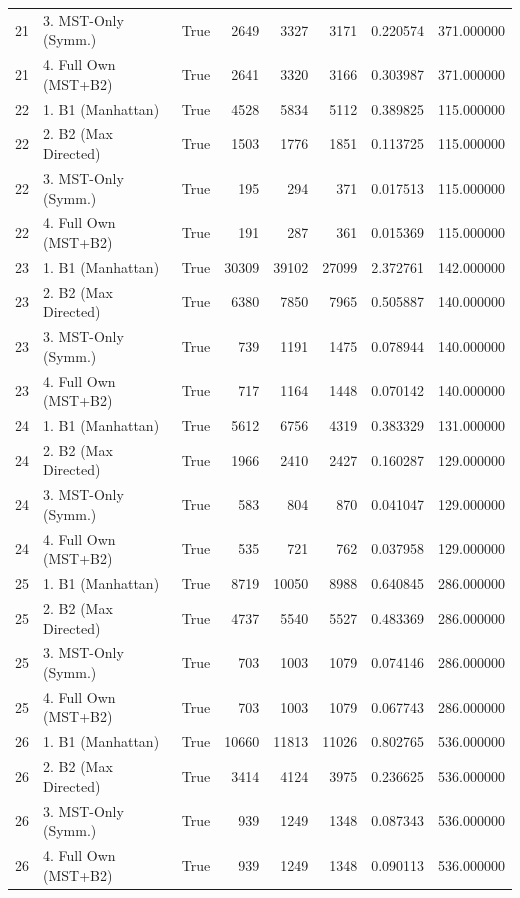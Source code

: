\begin{table}[htbp]
\begin{tabular}{rlrrrrrr}
21 & 3. MST-Only (Symm.) & True & 2649 & 3327 & 3171 & 0.220574 & 371.000000 \\
21 & 4. Full Own (MST+B2) & True & 2641 & 3320 & 3166 & 0.303987 & 371.000000 \\
22 & 1. B1 (Manhattan) & True & 4528 & 5834 & 5112 & 0.389825 & 115.000000 \\
22 & 2. B2 (Max Directed) & True & 1503 & 1776 & 1851 & 0.113725 & 115.000000 \\
22 & 3. MST-Only (Symm.) & True & 195 & 294 & 371 & 0.017513 & 115.000000 \\
22 & 4. Full Own (MST+B2) & True & 191 & 287 & 361 & 0.015369 & 115.000000 \\
23 & 1. B1 (Manhattan) & True & 30309 & 39102 & 27099 & 2.372761 & 142.000000 \\
23 & 2. B2 (Max Directed) & True & 6380 & 7850 & 7965 & 0.505887 & 140.000000 \\
23 & 3. MST-Only (Symm.) & True & 739 & 1191 & 1475 & 0.078944 & 140.000000 \\
23 & 4. Full Own (MST+B2) & True & 717 & 1164 & 1448 & 0.070142 & 140.000000 \\
24 & 1. B1 (Manhattan) & True & 5612 & 6756 & 4319 & 0.383329 & 131.000000 \\
24 & 2. B2 (Max Directed) & True & 1966 & 2410 & 2427 & 0.160287 & 129.000000 \\
24 & 3. MST-Only (Symm.) & True & 583 & 804 & 870 & 0.041047 & 129.000000 \\
24 & 4. Full Own (MST+B2) & True & 535 & 721 & 762 & 0.037958 & 129.000000 \\
25 & 1. B1 (Manhattan) & True & 8719 & 10050 & 8988 & 0.640845 & 286.000000 \\
25 & 2. B2 (Max Directed) & True & 4737 & 5540 & 5527 & 0.483369 & 286.000000 \\
25 & 3. MST-Only (Symm.) & True & 703 & 1003 & 1079 & 0.074146 & 286.000000 \\
25 & 4. Full Own (MST+B2) & True & 703 & 1003 & 1079 & 0.067743 & 286.000000 \\
26 & 1. B1 (Manhattan) & True & 10660 & 11813 & 11026 & 0.802765 & 536.000000 \\
26 & 2. B2 (Max Directed) & True & 3414 & 4124 & 3975 & 0.236625 & 536.000000 \\
26 & 3. MST-Only (Symm.) & True & 939 & 1249 & 1348 & 0.087343 & 536.000000 \\
26 & 4. Full Own (MST+B2) & True & 939 & 1249 & 1348 & 0.090113 & 536.000000 \\

\end{tabular}
\end{table}
